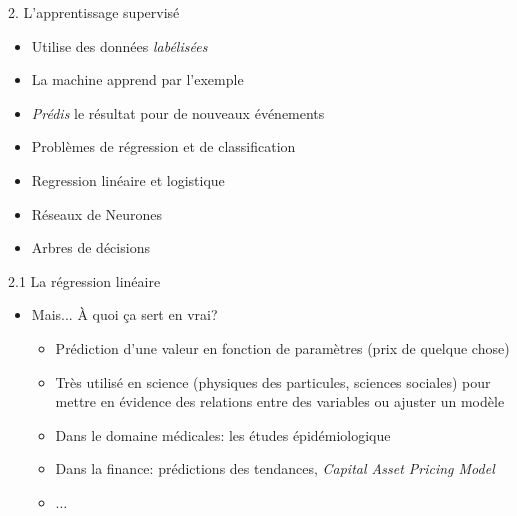 \begin{frame}{2. L'apprentissage supervisé}
  \begin{itemize}
  \item Utilise des données \textit{labélisées}
  \item La machine apprend par l'exemple
  \item \textit{Prédis} le résultat pour de nouveaux événements
  \item Problèmes de régression et de classification
  \item Regression linéaire et logistique
  \item Réseaux de Neurones
  \item Arbres de décisions
  \end{itemize}
\end{frame}

\begin{frame}{2.1 La régression linéaire}
  \begin{itemize}
  \item Mais... À quoi ça sert en vrai?
    \begin{itemize}
    \item Prédiction d'une valeur en fonction de paramètres (prix de quelque chose)
    \item Très utilisé en science (physiques des particules, sciences sociales) pour mettre en évidence des relations entre des variables ou ajuster un modèle
    \item Dans le domaine médicales: les études épidémiologique
    \item Dans la finance: prédictions des tendances, \textit{Capital Asset Pricing Model}
    \item $\dots$
    \end{itemize}
  \end{itemize}
\end{frame}

